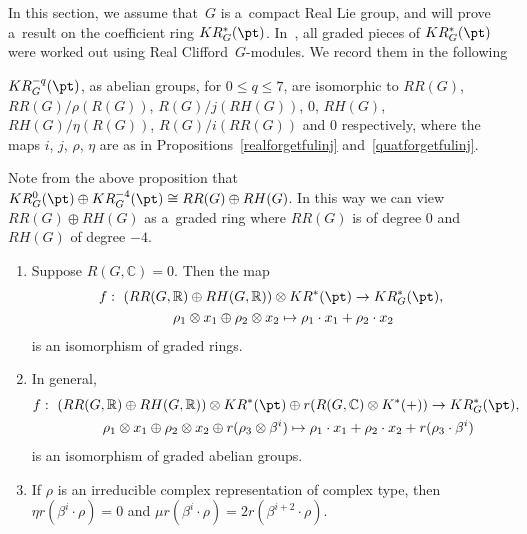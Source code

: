 In this section, we assume that~$G$ is a~compact Real Lie group, and will prove a~result on the coef\/f\/icient ring
$KR_G^*(\pt)$.
In~\cite{AS}, all graded pieces of $KR_G^*(\pt)$ were worked out using Real Clif\/ford~$G$-modules.
We record them in the following
\begin{Proposition}
\label{ASKRcomp}
$KR^{-q}_G(\pt)$, as abelian groups, for $0\leq q\leq 7$, are isomorphic to $RR(G)$, $RR(G)/\rho(R(G))$,
$R(G)/j(RH(G))$, $0$, $RH(G)$, $RH(G)/\eta(R(G))$, $R(G)/i(RR(G))$ and $0$ respectively, where the maps $i$, $j$, $\rho$, $\eta$
are as in Propositions~{\rm \ref{realforgetfulinj}} and~{\rm \ref{quatforgetfulinj}}.
\end{Proposition}
\begin{Remark}
Note from the above proposition
that $KR_G^0(\pt)\oplus KR^{-4}_G(\pt)\cong RR(G)\oplus RH(G)$.
In this way we can view $RR(G)\oplus RH(G)$ as a~graded ring where $RR(G)$ is of degree 0 and $RH(G)$ of degree $-4$.
\end{Remark}
\begin{Proposition}\label{KR_G}\quad
\begin{enumerate}\itemsep=0pt
\item[$1.$]
Suppose $R(G, \mathbb{C})=0$.
Then the map
\begin{gather*}
f:  \ (RR(G, \mathbb{R})\oplus RH(G, \mathbb{R}))\otimes KR^*(\pt)  \to  KR^*_G(\pt),
\\
\phantom{f: {}} \
\rho_1\otimes x_1\oplus \rho_2\otimes x_2  \mapsto  \rho_1\cdot x_1+\rho_2\cdot x_2
\end{gather*}
is an isomorphism of graded rings.
\item[$2.$]
In general,
\begin{gather*}
f: \ (RR(G, \mathbb{R})\oplus RH(G, \mathbb{R}))\otimes KR^*(\pt)\oplus r(R(G, \mathbb{C})\otimes K^*(+))\to
KR^*_G(\pt),
\\
\phantom{f: {}} \
\rho_1\otimes x_1\oplus \rho_2\otimes x_2\oplus r(\rho_3\otimes \beta^i)\mapsto \rho_1\cdot x_1+\rho_2\cdot
x_2+r(\rho_3\cdot\beta^i)
\end{gather*}
is an isomorphism of graded abelian groups.
\item[$3.$]
If $\rho$ is an irreducible complex representation of complex type, then $\eta r(\beta^i\cdot\rho)=0$ and $\mu
r(\beta^i\cdot\rho)=2r(\beta^{i+2}\cdot\rho)$.
\end{enumerate}
\end{Proposition}

